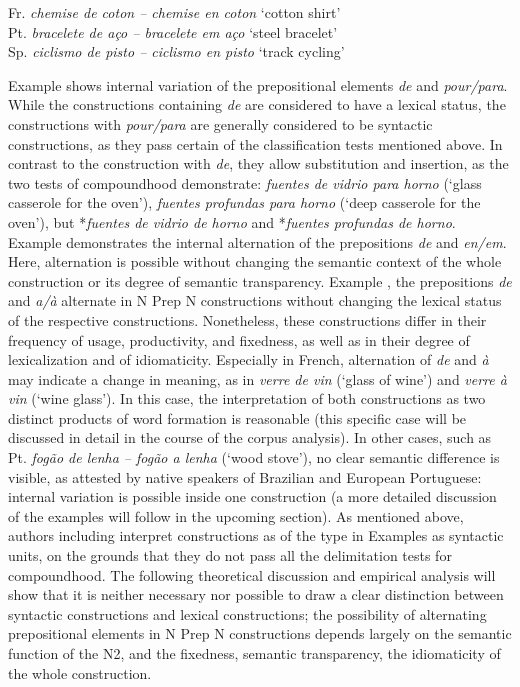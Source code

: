 \documentclass[output=paper]{langsci/langscibook}
\begin{document}
\ea \label{ex:hennecke:3}
  \ea\label{ex:hennecke:3a} Fr. \textit{chemise de coton – chemise en coton}   `cotton shirt' \\ 
  \ex\label{ex:hennecke:3b} Pt. \textit{bracelete de aço – bracelete em aço}  `steel bracelet' \\ 
  \ex\label{ex:hennecke:3c} Sp. \textit{ciclismo de pisto – ciclismo en pisto}   `track cycling' \\ 
  \z
\z
 
Example  shows internal variation of the prepositional elements \textit{de} and \textit{pour/para}. While the constructions containing \textit{de} are considered to have a lexical status, the constructions with \textit{pour/para} are generally considered to be syntactic constructions, as they pass certain of the classification tests mentioned above. In contrast to the construction with \textit{de}, they allow substitution and insertion, as the two tests of compoundhood demonstrate: \textit{fuentes de vidrio para horno} (`glass casserole for the oven'), \textit{fuentes profundas para horno} (`deep casserole for the oven'), but *\textit{fuentes de vidrio de horno} and *\textit{fuentes profundas de horno}. Example  demonstrates the internal alternation of the prepositions \textit{de} and \textit{en/em}. Here, alternation is possible without changing the semantic context of the whole construction or its degree of semantic transparency. Example , the prepositions \textit{de} and \textit{a/à} alternate in N Prep N constructions without changing the lexical status of the respective constructions. Nonetheless, these constructions differ in their frequency of usage, productivity, and fixedness, as well as in their degree of lexicalization and of idiomaticity. Especially in French, alternation of \textit{de} and \textit{à} may indicate a change in meaning, as in \textit{verre de vin} (`glass of wine') and \textit{verre à vin} (`wine glass'). In this case, the interpretation of both constructions as two distinct products of word formation is reasonable (this specific case will be discussed in detail in the course of the corpus analysis). In other cases, such as Pt. \textit{fogão de lenha – fogão a lenha} (`wood stove'), no clear semantic difference is visible, as attested by native speakers of Brazilian and European Portuguese: internal variation is possible inside one construction (a more detailed discussion of the examples will follow in the upcoming section). As mentioned above, authors including \citet{RioTorto:2009} interpret constructions as of the type in Examples  as syntactic units, on the grounds that they do not pass all the delimitation tests for compoundhood. The following theoretical discussion and empirical analysis will show that it is neither necessary nor possible to draw a clear distinction between syntactic constructions and lexical constructions; the possibility of alternating prepositional elements in N Prep N constructions depends largely on the semantic function of the N2, and the fixedness, semantic transparency, the idiomaticity of the whole construction.
  
\end{document}
